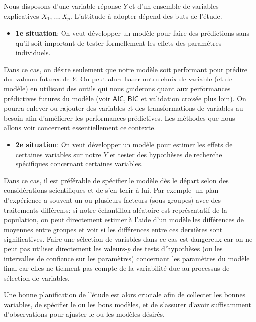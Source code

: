 \documentclass[
  11pt,
  letterpaper,
]{scrbook}
\providecommand{\tightlist}{%
  \setlength{\itemsep}{0pt}\setlength{\parskip}{0pt}}\usepackage{longtable,booktabs,array}
\theoremstyle{definition}
\theoremstyle{remark}
\begin{document}
Nous disposons d'une variable réponse \(Y\) et d'un ensemble de
variables explicatives \(X_1, \ldots, X_p\). L'attitude à adopter dépend
des buts de l'étude.

\begin{itemize}
\tightlist
\item
  \textbf{1e situation}: On veut développer un modèle pour faire des
  prédictions sans qu'il soit important de tester formellement les
  effets des paramètres individuels.
\end{itemize}

Dans ce cas, on désire seulement que notre modèle soit performant pour
prédire des valeurs futures de \(Y\). On peut alors baser notre choix de
variable (et de modèle) en utilisant des outils qui nous guiderons quant
aux performances prédictives futures du modèle (voir \(\mathsf{AIC}\),
\(\mathsf{BIC}\) et validation croisée plus loin). On pourra enlever ou
rajouter des variables et des transformations de variables au besoin
afin d'améliorer les performances prédictives. Les méthodes que nous
allons voir concernent essentiellement ce contexte.

\begin{itemize}
\tightlist
\item
  \textbf{2e situation}: On veut développer un modèle pour estimer les
  effets de certaines variables sur notre \(Y\) et tester des hypothèses
  de recherche spécifiques concernant certaines variables.
\end{itemize}

Dans ce cas, il est préférable de spécifier le modèle dès le départ
selon des considérations scientifiques et de s'en tenir à lui. Par
exemple, un plan d'expérience a souvent un ou plusieurs facteurs
(sous-groupes) avec des traitements différents: si notre échantillon
aléatoire est représentatif de la population, on peut directement
estimer à l'aide d'un modèle les différences de moyennes entre groupes
et voir si les différences entre ces dernières sont significatives.
Faire une sélection de variables dans ce cas est dangereux car on ne
peut pas utiliser directement les valeurs-\emph{p} des tests
d'hypothèses (ou les intervalles de confiance sur les paramètres)
concernant les paramètres du modèle final car elles ne tiennent pas
compte de la variabilité due au processus de sélection de variables.

Une bonne planification de l'étude est alors cruciale afin de collecter
les bonnes variables, de spécifier le ou les bons modèles, et de
s'assurer d'avoir suffisamment d'observations pour ajuster le ou les
modèles désirés.
\end{document}
